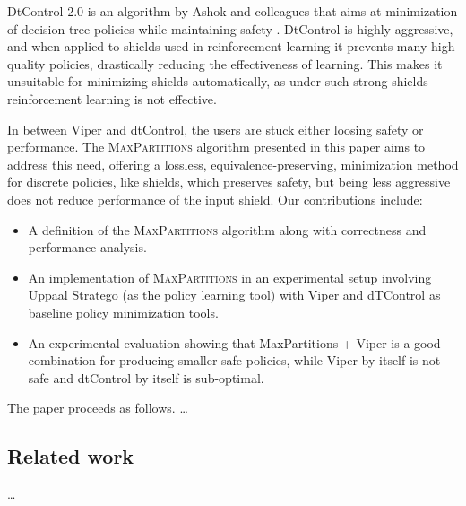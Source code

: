 DtControl 2.0 is an algorithm by Ashok and colleagues that aims at minimization of decision tree policies while maintaining safety \cite{dtControl,dtControl2}.  DtControl is highly aggressive, and when applied to shields used in reinforcement learning it prevents many high quality policies, drastically reducing the effectiveness of learning.  This makes it unsuitable for minimizing shields automatically, as under such strong shields reinforcement learning is not effective.

In between Viper and dtControl, the users are stuck either loosing safety or performance. The \textsc {MaxPartitions} algorithm presented in this paper aims to address this need, offering a lossless, equivalence-preserving, minimization method for discrete policies, like shields, which preserves safety, but being less aggressive does not reduce performance of the input shield. Our contributions include:
%
\begin {itemize}

\item A definition of the \textsc {MaxPartitions} algorithm along with correctness and performance analysis.

\item An implementation of \textsc {MaxPartitions} in an experimental setup involving Uppaal Stratego (as the policy learning tool) with Viper and dTControl as baseline policy minimization tools.

\item An experimental evaluation showing that MaxPartitions + Viper is a good combination for producing smaller safe policies, while Viper by itself is not safe and dtControl by itself is sub-optimal.

\end {itemize}

\noindent
The paper proceeds as follows. \ldots \textcolor {orange} {\lipsum [4]}

\subsection{Related work}%
\label{sub:relatedWork}

\ldots \textcolor {orange} {\lipsum[3]}
